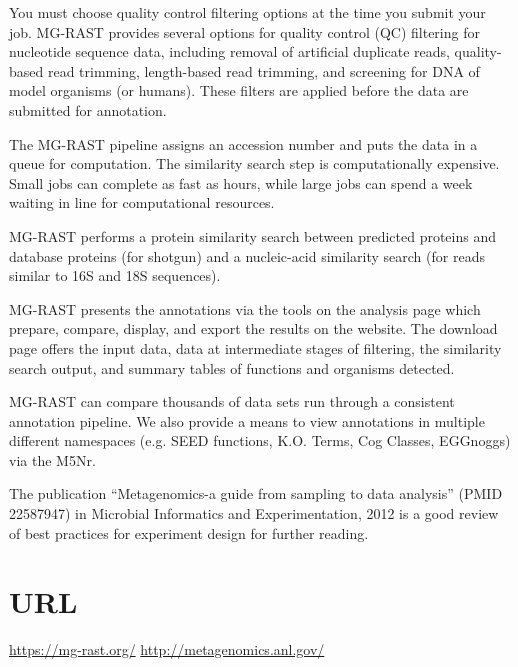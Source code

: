 \documentclass[12pt,fullpage]{report}
\begin{document}
You must choose quality control filtering options at the time you submit your job. MG-RAST provides several options for  quality control (QC) filtering for nucleotide sequence data, including  removal of artificial duplicate reads, quality-based read trimming, length-based read trimming, and screening for DNA of model organisms (or humans). These filters are applied before the data are submitted for annotation.

The MG-RAST pipeline assigns an accession number and puts the data in a queue for computation.  The similarity search step is computationally expensive. Small jobs can complete as fast as hours, while large jobs can spend a week waiting in line for computational resources.

MG-RAST performs a protein similarity search between predicted proteins and database proteins (for shotgun) and a nucleic-acid similarity search (for reads similar to 16S and 18S sequences).

MG-RAST presents the annotations via the tools on the analysis page which prepare, compare, display, and export the results on the website. The download page offers the input data, data at intermediate stages of filtering, the similarity search output, and summary tables of functions and organisms detected.

MG-RAST can compare thousands of data sets run through a consistent annotation pipeline.  We also provide a means to view annotations in multiple different namespaces (e.g. SEED functions, K.O. Terms, Cog Classes, EGGnoggs) via the M5Nr.

The publication ``Metagenomics-a guide from sampling to data analysis'' (PMID 22587947) in Microbial Informatics and Experimentation, 2012 is a good review of best practices for experiment design for further reading.
\section{URL}
\label{section:MG-RAST-URL}
\url{https://mg-rast.org/}
\url{http://metagenomics.anl.gov/}



\end{document}
